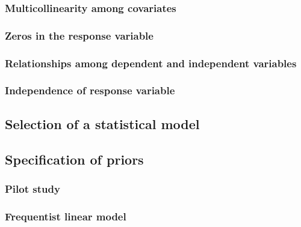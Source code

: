 \documentclass[
]{book}
\begin{document}
\hypertarget{multicollinearity-among-covariates-1}{%
\subsubsection{Multicollinearity among
covariates}\label{multicollinearity-among-covariates-1}}

\hypertarget{zeros-in-the-response-variable}{%
\subsubsection{Zeros in the response
variable}\label{zeros-in-the-response-variable}}

\hypertarget{relationships-among-dependent-and-independent-variables-1}{%
\subsubsection{Relationships among dependent and independent
variables}\label{relationships-among-dependent-and-independent-variables-1}}

\hypertarget{independence-of-response-variable}{%
\subsubsection{Independence of response
variable}\label{independence-of-response-variable}}

\hypertarget{selection-of-a-statistical-model}{%
\subsection{Selection of a statistical
model}\label{selection-of-a-statistical-model}}

\hypertarget{specification-of-priors}{%
\subsection{Specification of priors}\label{specification-of-priors}}

\hypertarget{pilot}{%
\subsubsection{Pilot study}\label{pilot}}

\hypertarget{frequentist-linear-model}{%
\subsubsection{Frequentist linear
model}\label{frequentist-linear-model}}
\end{document}
